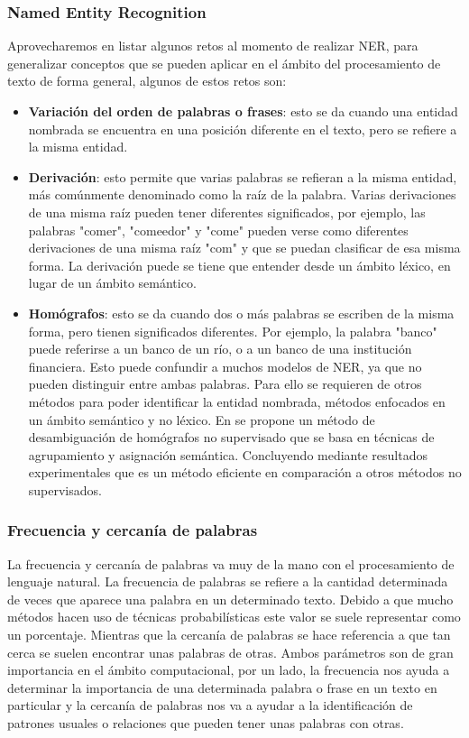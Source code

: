 \documentclass[12pt, conference]{IEEEtran}
\begin{document}
\subsubsection{Named Entity Recognition}\label{subsubsec:NER}
Aprovecharemos en listar algunos retos al momento de realizar NER, para generalizar conceptos que se pueden aplicar en el ámbito del procesamiento de texto de forma general, algunos de estos retos son: 
\begin{itemize}
  \item \textbf{Variación del orden de palabras o frases}: esto se da cuando una entidad nombrada se encuentra en una posición diferente en el texto, pero se refiere a la misma entidad.
  \item \textbf{Derivación}: esto permite que varias palabras se refieran a la misma entidad, más comúnmente denominado como la raíz de la palabra. Varias derivaciones de una misma raíz pueden tener diferentes significados, por ejemplo, las palabras "comer", "comeedor" y "come" pueden verse como diferentes derivaciones de una misma raíz "com" y que se puedan clasificar de esa misma forma.
  La derivación puede se tiene que entender desde un ámbito léxico, en lugar de un ámbito semántico.
  \item \textbf{Homógrafos}: esto se da cuando dos o más palabras se escriben de la misma forma, pero tienen significados diferentes. Por ejemplo, la palabra "banco" puede referirse a un banco de un río, o a un banco de una institución financiera. Esto puede confundir a muchos modelos de NER, ya que no pueden distinguir entre ambas palabras. Para ello se requieren de otros métodos para poder identificar la entidad nombrada, métodos enfocados en un ámbito semántico y no léxico. En \cite{b18} se propone un método de desambiguación de homógrafos no supervisado que se basa en técnicas de agrupamiento y asignación semántica. Concluyendo mediante resultados experimentales que es un método eficiente en comparación a otros métodos no supervisados.
\end{itemize}

\subsubsection{Frecuencia y cercanía de palabras}

La frecuencia y cercanía de palabras va muy de la mano con el procesamiento de lenguaje natural. La frecuencia de palabras se refiere a la cantidad determinada de veces que aparece una palabra en un determinado texto. 
Debido a que mucho métodos hacen uso de técnicas probabilísticas este valor se suele representar como un porcentaje. 
Mientras que la cercanía de palabras se hace referencia a que tan cerca se suelen encontrar unas palabras de otras. 
Ambos parámetros son de gran importancia en el ámbito computacional, por un lado, la frecuencia nos ayuda a determinar la importancia de una determinada palabra o frase en un texto en particular y la cercanía de palabras nos va a ayudar a la identificación de patrones usuales o relaciones que pueden tener unas palabras con otras.
\end{document}
